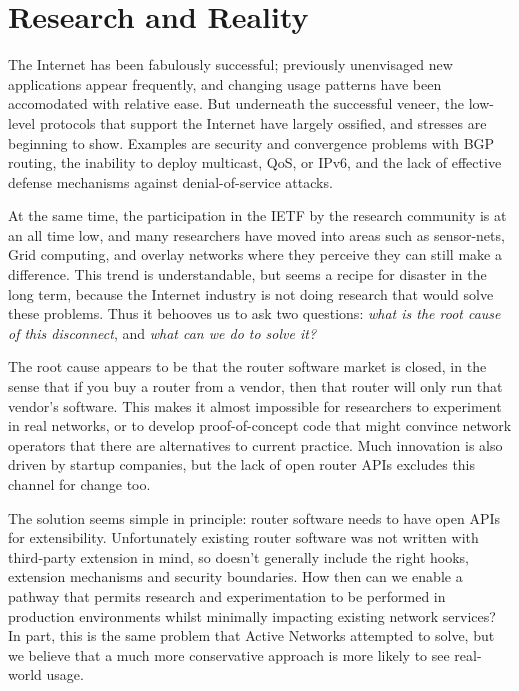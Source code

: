 
\section{Research and Reality}

The Internet has been fabulously successful; previously unenvisaged
new applications appear frequently, and changing usage patterns have
been accomodated with relative ease.  But underneath the successful
veneer, the low-level protocols that support the Internet have largely
ossified, and stresses are beginning to show.  Examples are security
and convergence problems with BGP routing, the inability to deploy
multicast, QoS, or IPv6, and the lack of effective defense mechanisms
against denial-of-service attacks.

At the same time, the participation in the IETF by the research
community is at an all time low, and many researchers
have moved into areas such
as sensor-nets, Grid computing, and overlay networks where they
perceive they can still make a difference.  This trend is
understandable, but seems a recipe for disaster in the long term,
because the Internet industry is not doing research that would
solve these problems. Thus it behooves us to ask two questions: {\it
what is the root cause of this disconnect}, and {\it what can we do to
solve it?}

The root cause appears to be that the router software market is
closed, in the sense that if you buy a router from a vendor, then that
router will only run that vendor's software.  This makes it almost
impossible for researchers to experiment in real networks, or to
develop proof-of-concept code that might convince network operators
that there are alternatives to current practice.  Much innovation is
also driven by startup companies, but the lack of open router APIs
excludes this channel for change too.

The solution seems simple in principle: router software needs to have
open APIs for extensibility.  Unfortunately existing router software
was not written with third-party extension in mind, so doesn't
generally include the right hooks, extension mechanisms and security
boundaries.  
How then can we enable a pathway that permits research and
experimentation to be performed in production environments whilst
minimally impacting existing network services?  In part, this
is the same problem that Active Networks attempted to solve, but we
believe that a much more conservative approach is more likely to see
real-world usage.

